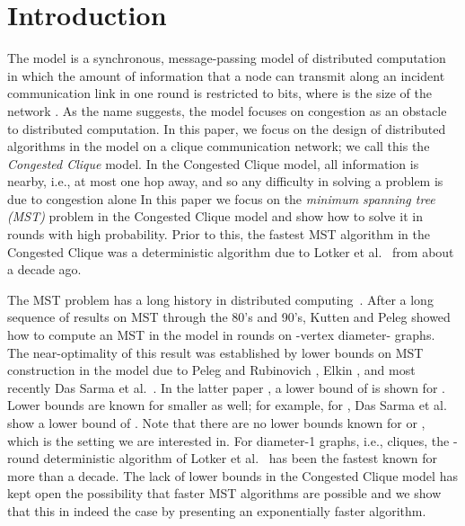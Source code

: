 \documentclass[11pt]{article}
\begin{document}
\section{Introduction}
The  model is a synchronous, message-passing model of distributed
computation in which the amount of information that a node can transmit along
an incident communication link in one round is restricted to  bits, where
 is the size of the network \cite{peleg2000distributed}. As the name suggests, the
 model focuses on congestion as an obstacle to distributed computation. 
In this paper, we focus on the design of distributed algorithms in the
 model on a clique communication network; we call this the
\textit{Congested Clique} model. In the Congested Clique model, all information is nearby, i.e., 
at most one hop away, and so any difficulty in solving a problem is due to congestion alone
In this paper we focus on the \textit{minimum spanning tree (MST)} problem in the Congested
Clique model and show how to solve it in  rounds with high probability.
Prior to this, the fastest MST algorithm in the Congested Clique was a deterministic algorithm 
due to Lotker et al.~\cite{lotker2005mstJournal} from about a decade ago.

The MST problem has a long history in distributed computing~\cite{gallager1983ghs, awerbuch1987optimal,garay1998sublinear, KhanTheoreticalCS2007}.
After a long sequence of results on MST through the 80's and 90's, Kutten and Peleg 
\cite{KuttenPeleg1998} showed how to compute an MST in the  model in  
rounds on -vertex diameter- graphs.
The near-optimality of this result was established by lower bounds on MST construction in the 
 model due to Peleg and Rubinovich \cite{PelegRubinovich2000}, Elkin \cite{Elkin2006}, and most recently
Das Sarma et al.~\cite{DasSarmaSICOMP2011}.
In the latter paper \cite{DasSarmaSICOMP2011}, a lower bound of  is shown for 
.
Lower bounds are known for smaller  as well; for example, for , Das Sarma et al.~\cite{DasSarmaSICOMP2011}
show a lower bound of .
Note that there are no lower bounds known for  or , which is the setting we are 
interested in.
For diameter-1 graphs, i.e., cliques, the -round deterministic algorithm of 
Lotker et al.~\cite{lotker2005mstJournal} has been the fastest known for more than a decade.
The lack of lower bounds in the Congested Clique model has kept open the possibility that faster
MST algorithms are possible and we show that this in indeed the case by presenting an exponentially
faster algorithm.
\end{document}
